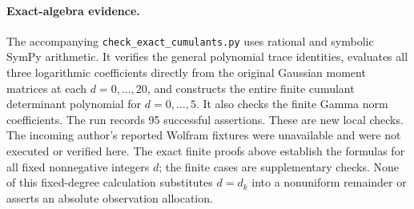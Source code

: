\documentclass[11pt]{article}
\begin{document}
\paragraph{Exact-algebra evidence.}
The accompanying \texttt{check\_exact\_cumulants.py} uses rational and
symbolic SymPy arithmetic. It verifies the general polynomial trace
identities, evaluates all three logarithmic coefficients directly from
the original Gaussian moment matrices at each \(d=0,\ldots,20\), and
constructs the entire finite cumulant determinant polynomial for
\(d=0,\ldots,5\). It also checks the finite Gamma norm coefficients.
The run records 95 successful assertions. These are new local checks.
The incoming author's reported Wolfram fixtures were unavailable and
were not executed or verified here. The exact finite proofs above
establish the formulas for all fixed nonnegative integers \(d\);
the finite cases are supplementary checks. None of this fixed-degree
calculation substitutes \(d=d_k\) into a nonuniform remainder or
asserts an absolute observation allocation.

\end{document}
